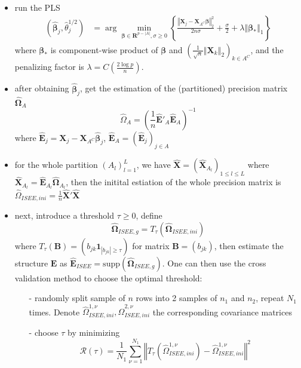 \documentclass[twoside]{article}
\begin{document}
\begin{itemize}
    \item run the PLS 
    \begin{align*}
        \left(\hat{\boldsymbol{\beta}}_j,\hat{\theta}_j^{1/2}\right) &= \arg\min_{\boldsymbol{\beta}\in\mathbf{R}^{p-\left\vert A \right\vert },\sigma\geq 0} \left\{ \frac{\left\Vert \mathbf{X}_j-\mathbf{X}_{A^C} \boldsymbol{\beta} \right\Vert^2_2}{2n\sigma} + \frac{\sigma}{2} + \lambda\left\Vert \boldsymbol{\beta}_*\right\Vert _1 \right\}
    \end{align*}
    where $\boldsymbol{\beta}_*$ is component-wise product of $\boldsymbol{\beta}$ and $\left( \frac{1}{\sqrt{n}}\left\Vert \mathbf{X}_k \right\Vert _2 \right)_{k\in A^C}$, and the penalizing factor is $\lambda = C\left( \frac{2\log p}{n} \right)$.
    \item after obtaining $\hat{\boldsymbol{\beta}}_j$, get the estimation of the (partitioned) precision matrix $\hat{\boldsymbol{\Omega}}_A$ $$ \hat{\Omega}_A = \left(\frac{1}{n}\hat{\mathbf{E}}'_A\hat{\mathbf{E}}_A\right)^{-1} $$ where $\hat{\mathbf{E}}_j = \mathbf{X}_j -\mathbf{X}_{A^C}\hat{\boldsymbol{\beta}}_j$, $\hat{\mathbf{E}}_A=\left( \hat{\mathbf{E}}_j \right)_{j\in A}$
    \item for the whole partition $(A_l)^L_{l=1}$, we have $\hat{\mathbf{X}} = (\hat{\mathbf{X}}_{A_l})_{1\leq l\leq L}$ where $\hat{\mathbf{X}}_{A_l}=\hat{\mathbf{E}}_{A_l}\hat{\boldsymbol{\Omega}}_{A_l}$, then the initital estiation of the whole precision matrix is $\hat{\Omega}_{ISEE,ini} = \frac{1}{n}\hat{\mathbf{X}}'\hat{\mathbf{X}}$
    \item next, introduce a threshold $\tau \geq 0$, define $$ \hat{\boldsymbol{\Omega}}_{ISEE,g} = T_{\tau}\left( \hat{\boldsymbol{\Omega}}_{ISEE,ini} \right) $$ where $T_{\tau}(\mathbf{B}) = \left( b_{jk}\mathbf{1}_{\left\vert b_{jk}\right\vert \geq \tau} \right)$ for matrix $\mathbf{B}=\left(b_{jk}\right)$, then estimate the structure $\mathbf{E}$ as $\hat{\mathbf{E}}_{ISEE}=\mathrm{supp}\left( \hat{\boldsymbol{\Omega}}_{ISEE,g}\right)$. One can then use the cross validation method to choose the optimal threshold:
    \begin{itemize}
        \item[-] randomly split sample of $n$ rows into 2 samples of $n_1$ and $n_2$, repeat $N_1$ times. Denote $\hat{\Omega}^{1,\nu}_{ISEE,ini},\hat{\Omega}^{2,\nu}_{ISEE,ini}$ the corresponding covariance matrices
        \item[-] choose $\tau$ by minimizing $$ \mathcal{R}(\tau) = \frac{1}{N_1}\sum^{N_1}_{\nu=1}\left\Vert T_{\tau}\left( \hat{\Omega}^{1,\nu}_{ISEE,ini} \right) - \hat{\Omega}^{1,\nu}_{ISEE,ini} \right\Vert^2$$
    \end{itemize}
\end{itemize} 
\end{document}
